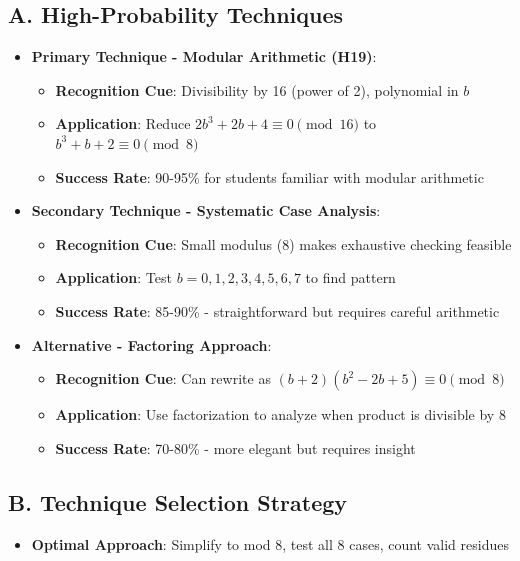 \documentclass[11pt]{article}
\begin{document}
\begin{techniquesbox}
\subsection*{A. High-Probability Techniques}
\begin{itemize}[leftmargin=*]
    \item \textbf{Primary Technique - Modular Arithmetic (H19)}: 
    \begin{itemize}
        \item \textbf{Recognition Cue}: Divisibility by 16 (power of 2), polynomial in $b$
        \item \textbf{Application}: Reduce $2b^3 + 2b + 4 \equiv 0 \pmod{16}$ to $b^3 + b + 2 \equiv 0 \pmod{8}$
        \item \textbf{Success Rate}: 90-95\% for students familiar with modular arithmetic
    \end{itemize}
    
    \item \textbf{Secondary Technique - Systematic Case Analysis}: 
    \begin{itemize}
        \item \textbf{Recognition Cue}: Small modulus (8) makes exhaustive checking feasible
        \item \textbf{Application}: Test $b = 0, 1, 2, 3, 4, 5, 6, 7$ to find pattern
        \item \textbf{Success Rate}: 85-90\% - straightforward but requires careful arithmetic
    \end{itemize}
    
    \item \textbf{Alternative - Factoring Approach}: 
    \begin{itemize}
        \item \textbf{Recognition Cue}: Can rewrite as $(b+2)(b^2-2b+5) \equiv 0 \pmod{8}$
        \item \textbf{Application}: Use factorization to analyze when product is divisible by 8
        \item \textbf{Success Rate}: 70-80\% - more elegant but requires insight
    \end{itemize}
\end{itemize}

\subsection*{B. Technique Selection Strategy}
\begin{itemize}[leftmargin=*]
    \item \textbf{Optimal Approach}: Simplify to mod 8, test all 8 cases, count valid residues
    

\end{itemize}
\end{techniquesbox}
\end{document}
